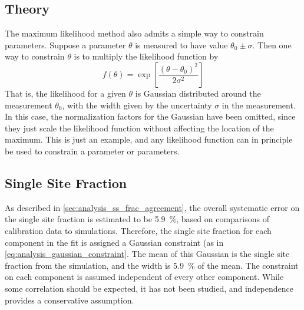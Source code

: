 \documentclass[herrin-thesis.tex]{subfiles}
\begin{document}
\subsection{Theory}
The maximum likelihood method also admits a simple way to constrain parameters. Suppose a parameter \(\theta\) is measured to have value \(\theta_0 \pm \sigma\). Then one way to constrain \(\theta\) is to multiply the likelihood function by
\begin{equation}
f(\theta) = \exp\left[\frac{(\theta-\theta_0)^2}{2\sigma^2}\right]
\label{eq:analysis_gaussian_constraint}
\end{equation}
That is, the likelihood for a given \(\theta\) is Gaussian distributed around the measurement \(\theta_0\), with the width given by the uncertainty \(\sigma\) in the measurement. In this case, the normalization factors for the Gaussian have been omitted, since they just scale the likelihood function without affecting the location of the maximum. This is just an example, and any likelihood function can in principle be used to constrain a parameter or parameters.

\subsection{Single Site Fraction}
As described in \cref{sec:analysis_ss_frac_agreement}, the overall systematic error on the single site fraction is estimated to be \SI{5.9}{\percent}, based on comparisons of calibration data to simulations. Therefore, the single site fraction for each component in the fit is assigned a Gaussian constraint (as in \cref{eq:analysis_gaussian_constraint}. The mean of this Gaussian is the single site fraction from the simulation, and the width is \SI{5.9}{\percent} of the mean. The constraint on each component is assumed independent of every other component. While some correlation should be expected, it has not been studied, and independence provides a conservative assumption.
\end{document}
